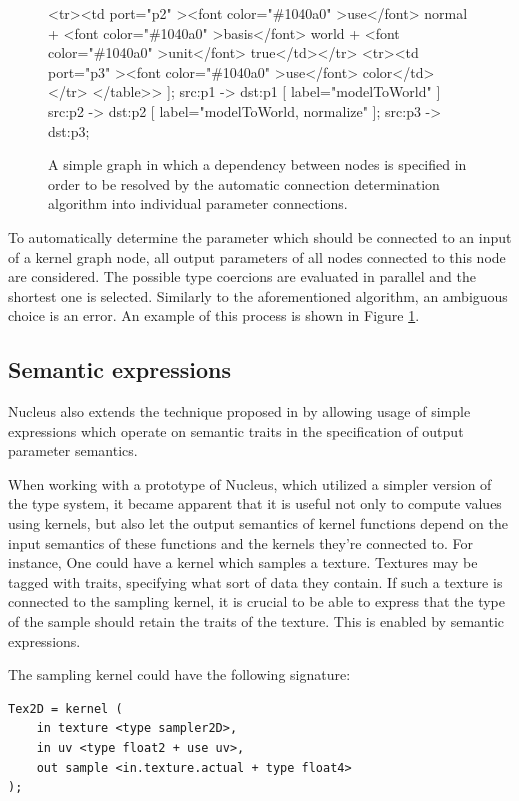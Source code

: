 \begin{figure}[h!]
{{    			<tr><td port="p2" ><font color="\#1040a0" >use</font> normal + <font color="\#1040a0" >basis</font> world + <font color="\#1040a0" >unit</font> true</td></tr>
    			<tr><td port="p3" ><font color="\#1040a0" >use</font> color</td></tr>
    			</table>>
    		];
    		src:p1 -> dst:p1 [ label="modelToWorld" ]
    		src:p2 -> dst:p2 [ label="modelToWorld, normalize" ];
    		src:p3 -> dst:p3;
	}}
  \caption[Automatic connection determination example]{A simple graph in which a dependency between nodes is specified in order to be resolved by the automatic connection determination algorithm into individual parameter connections.}
  \label{fig:AutoSemanticGraph}
\end{figure}

To automatically determine the parameter which should be connected to an input of a kernel graph node, all output parameters of all nodes connected to this node are considered. The possible type coercions are evaluated in parallel and the shortest one is selected. Similarly to the aforementioned algorithm, an ambiguous choice is an error. An example of this process is shown in Figure \ref{fig:AutoSemanticGraph}.

\subsection{Semantic expressions}
\label{sec:SemanticExpressions}

Nucleus also extends the technique proposed in \cite{mcguire2006shadetrees} by allowing usage of simple expressions which operate on semantic traits in the specification of output parameter semantics.

When working with a prototype of Nucleus, which utilized a simpler version of the type system, it became apparent that it is useful not only to compute values using kernels, but also let the output semantics of kernel functions depend on the input semantics of these functions and the kernels they're connected to. For instance, One could have a kernel which samples a texture. Textures may be tagged with traits, specifying what sort of data they contain. If such a texture is connected to the sampling kernel, it is crucial to be able to express that the type of the sample should retain the traits of the texture. This is enabled by semantic expressions.

The sampling kernel could have the following signature:

\begin{lstlisting}[frame=single]
Tex2D = kernel (
    in texture <type sampler2D>,
    in uv <type float2 + use uv>,
    out sample <in.texture.actual + type float4>
);
\end{lstlisting}

